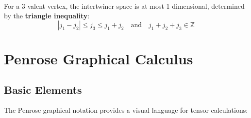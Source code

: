\documentclass[11pt,a4paper,twoside]{book}
\theoremstyle{definition}
\begin{document}
For a 3-valent vertex, the intertwiner space is at most 1-dimensional, 
determined by the \textbf{triangle inequality}:
\begin{equation}
    |j_1 - j_2| \leq j_3 \leq j_1 + j_2 \quad \text{and} \quad 
    j_1 + j_2 + j_3 \in \mathbb{Z}
\end{equation}

\chapter{Penrose Graphical Calculus}
\label{ch:penrose_calculus}

\section{Basic Elements}

The Penrose graphical notation provides a visual language for tensor calculations:
\end{document}
